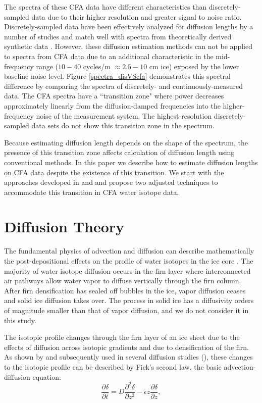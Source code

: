 \documentclass[draft, jgrga]{AGUTeX}
\begin{document}
\begin{article}
The spectra of these CFA data have different characteristics than discretely-sampled data due to their higher resolution and greater signal to noise ratio. Discretely-sampled data have been effectively analyzed for diffusion lengths by a number of studies \citep{Johnsen2000,Simonsen2011,Gkinis2014,vanderWel2015} and match well with spectra from theoretically derived synthetic data \citep{Holme2017}. However, these diffusion estimation methods can not be applied to spectra from CFA data due to an additional characteristic in the mid-frequency range ($10-40$ cycles/m $\approx 2.5-10$ cm ice) exposed by the lower baseline noise level. Figure \ref{spectra_disVScfa} demonstrates this spectral difference by comparing the spectra of discretely- and continuously-measured data. The CFA spectra have a ``transition zone" where power decreases approximately linearly from the diffusion-damped frequencies into the higher-frequency noise of the measurement system. The highest-resolution discretely-sampled data sets do not show this transition zone in the spectrum.

Because estimating diffusion length depends on the shape of the spectrum, the presence of this transition zone affects calculation of diffusion length using conventional methods. In this paper we describe how to estimate diffusion lengths on CFA data despite the existence of this transition. We start with the approaches developed in \citet{Johnsen2000} and \citet{Gkinis2014} and propose two adjusted techniques to accommodate this transition in CFA water isotope data.


\section{Diffusion Theory}

The fundamental physics of advection and diffusion can describe mathematically the post-depositional effects on the profile of water isotopes in the ice core \citep{Johnsen1977}. The majority of water isotope diffusion occurs in the firn layer where interconnected air pathways allow water vapor to diffuse vertically through the firn column. After firn densification has sealed off bubbles in the ice, vapor diffusion ceases and solid ice diffusion takes over. The process in solid ice has a diffusivity orders of magnitude smaller than that of vapor diffusion, and we do not consider it in this study.

The isotopic profile changes through the firn layer of an ice sheet due to the effects of diffusion across isotopic gradients and due to densification of the firn. As shown by \citet{Johnsen1977} and subsequently used in several diffusion studies (\citep{Johnsen2000, Simonsen2011, Gkinis2014, vanderWel2015, Jones2017a, Holme2017}), these changes to the isotopic profile can be described by Fick's second law, the basic advection-diffusion equation:
\begin{equation}
\frac{\partial \delta}{\partial t}
= D \frac{\partial ^2 \delta}{\partial z^2}
- \dot{\epsilon}
z \frac{\partial \delta}{\partial z},
\end{equation}


\end{article}
\end{document}
